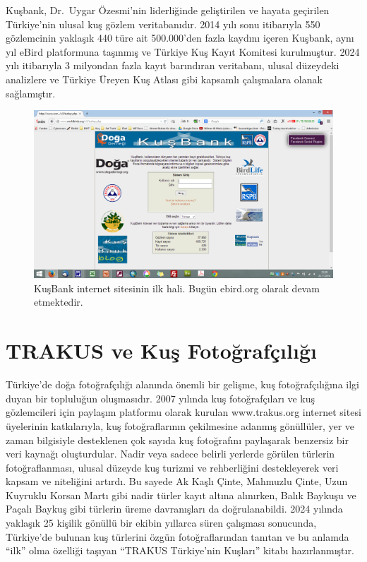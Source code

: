 \documentclass[
  a4paper,
  DIV=11,
  numbers=noendperiod]{scrartcl}
\begin{document}
Kuşbank, Dr.~Uygar Özesmi'nin liderliğinde geliştirilen ve hayata
geçirilen Türkiye'nin ulusal kuş gözlem veritabanıdır. 2014 yılı sonu
itibarıyla 550 gözlemcinin yaklaşık 440 türe ait 500.000'den fazla
kaydını içeren Kuşbank, aynı yıl eBird platformuna taşınmış ve Türkiye
Kuş Kayıt Komitesi kurulmuştur. 2024 yılı itibarıyla 3 milyondan fazla
kayıt barındıran veritabanı, ulusal düzeydeki analizlere ve Türkiye
Üreyen Kuş Atlası gibi kapsamlı çalışmalara olanak sağlamıştır.

\begin{figure}[H]

{\centering \includegraphics{images/kusbank.png}

}

\caption{KuşBank internet sitesinin ilk hali. Bugün ebird.org olarak
devam etmektedir.}

\end{figure}%

\section*{TRAKUS ve Kuş
Fotoğrafçılığı}\label{trakus-ve-kuux15f-fotoux11frafuxe7ux131lux131ux11fux131}


Türkiye'de doğa fotoğrafçılığı alanında önemli bir gelişme, kuş
fotoğrafçılığına ilgi duyan bir topluluğun oluşmasıdır. 2007 yılında kuş
fotoğrafçıları ve kuş gözlemcileri için paylaşım platformu olarak
kurulan www.trakus.org internet sitesi üyelerinin katkılarıyla, kuş
fotoğraflarının çekilmesine adanmış gönüllüler, yer ve zaman bilgisiyle
desteklenen çok sayıda kuş fotoğrafını paylaşarak benzersiz bir veri
kaynağı oluşturdular. Nadir veya sadece belirli yerlerde görülen
türlerin fotoğraflanması, ulusal düzeyde kuş turizmi ve rehberliğini
destekleyerek veri kapsam ve niteliğini artırdı. Bu sayede Ak Kaşlı
Çinte, Mahmuzlu Çinte, Uzun Kuyruklu Korsan Martı gibi nadir türler
kayıt altına alınırken, Balık Baykuşu ve Paçalı Baykuş gibi türlerin
üreme davranışları da doğrulanabildi. 2024 yılında yaklaşık 25 kişilik
gönüllü bir ekibin yıllarca süren çalışması sonucunda, Türkiye'de
bulunan kuş türlerini özgün fotoğraflarından tanıtan ve bu anlamda
``ilk'' olma özelliği taşıyan ``TRAKUS Türkiye'nin Kuşları'' kitabı
hazırlanmıştır.
\end{document}
